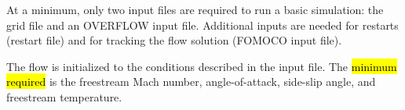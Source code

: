 At a minimum, only two input files are required to run a basic simulation: the grid file and an OVERFLOW input file. Additional inputs are needed for restarts (restart file) and for tracking the flow solution (FOMOCO input file). 

The flow is initialized to the conditions described in the input file. The \hl{minimum required} is the freestream Mach number, angle-of-attack, side-slip angle, and freestream temperature.



% 

